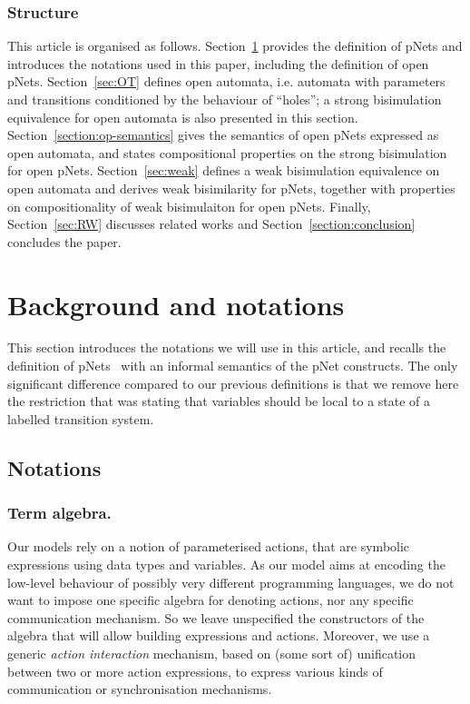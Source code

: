 \documentclass{lmcs}
\begin{document}
\subsubsection*{Structure}
This article is organised as follows. Section~\ref{sec:notations}
provides the definition of pNets and introduces the notations used in
this paper, including the definition of open pNets. 
Section~\ref{sec:OT} defines open automata, i.e. automata
with parameters and transitions conditioned by the behaviour of
``holes''; a strong bisimulation equivalence for open automata is also
presented in this section. 
Section~\ref{section:op-semantics} gives
the semantics of open pNets expressed as open automata, and states
compositional properties on the strong bisimulation for open
pNets. 
Section~\ref{sec:weak} defines a weak bisimulation
equivalence on open automata and derives weak bisimilarity for pNets,
together with properties on compositionality of weak bisimulaiton for
open pNets. 
Finally, Section~\ref{sec:RW} discusses related works and Section~\ref{section:conclusion} concludes the
paper. 


\section{Background and notations}\label{sec:notations}
This section introduces the notations we will use in this article, and  recalls the definition of pNets~\cite{henrio:Forte2016} with an informal semantics  of the pNet constructs. The only significant difference compared to our previous definitions is that we remove here the restriction that was stating that variables should be local to a state of a labelled transition system.




\subsection{Notations}
\subsubsection*{Term algebra.}
Our models rely on a notion of parameterised actions, that are
symbolic expressions using data types and variables. As our model aims
at encoding the low-level behaviour of possibly very different
programming languages, we do not want to impose one specific algebra
for denoting actions, nor any specific communication mechanism. So we
leave unspecified the constructors of the algebra that will allow building
expressions and actions. Moreover, we use a generic {\em action interaction}
mechanism, based on (some sort of) unification between two or more action
expressions, to express various kinds of communication or
synchronisation mechanisms.
\end{document}
